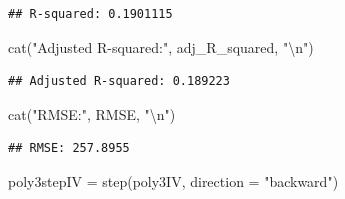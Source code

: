 \documentclass[
]{article}
\newenvironment{Shaded}{\begin{snugshade}}{\end{snugshade}}
\newcommand{\AttributeTok}[1]{\textcolor[rgb]{0.77,0.63,0.00}{#1}}
\newcommand{\FunctionTok}[1]{\textcolor[rgb]{0.00,0.00,0.00}{#1}}
\newcommand{\NormalTok}[1]{#1}
\newcommand{\OtherTok}[1]{\textcolor[rgb]{0.56,0.35,0.01}{#1}}
\newcommand{\SpecialCharTok}[1]{\textcolor[rgb]{0.00,0.00,0.00}{#1}}
\newcommand{\StringTok}[1]{\textcolor[rgb]{0.31,0.60,0.02}{#1}}
\begin{document}
\begin{verbatim}
## R-squared: 0.1901115
\end{verbatim}

\begin{Shaded}
\begin{Highlighting}[]
\FunctionTok{cat}\NormalTok{(}\StringTok{"Adjusted R{-}squared:"}\NormalTok{, adj\_R\_squared, }\StringTok{"}\SpecialCharTok{\textbackslash{}n}\StringTok{"}\NormalTok{)}
\end{Highlighting}
\end{Shaded}

\begin{verbatim}
## Adjusted R-squared: 0.189223
\end{verbatim}

\begin{Shaded}
\begin{Highlighting}[]
\FunctionTok{cat}\NormalTok{(}\StringTok{"RMSE:"}\NormalTok{, RMSE, }\StringTok{"}\SpecialCharTok{\textbackslash{}n}\StringTok{"}\NormalTok{)}
\end{Highlighting}
\end{Shaded}

\begin{verbatim}
## RMSE: 257.8955
\end{verbatim}

\begin{Shaded}
\begin{Highlighting}[]
\NormalTok{poly3stepIV }\OtherTok{=} \FunctionTok{step}\NormalTok{(poly3IV, }\AttributeTok{direction =} \StringTok{"backward"}\NormalTok{)}
\end{Highlighting}
\end{Shaded}
\end{document}
